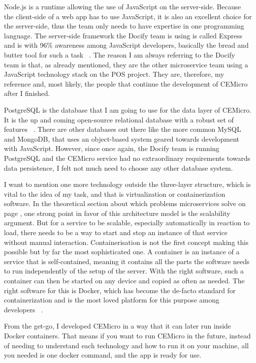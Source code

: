Node.js is a runtime allowing the use of JavaScript on the server-side. Because the client-side of a web app has to use JavaScript, it is also an excellent choice for the server-side, thus the team only needs to have expertise in one programming language. The server-side framework the Docify team is using is called Express and is with 96\% awareness among JavaScript developers, basically the bread and butter tool for such a task ~\cite{stateofjs.2019}. The reason I am always referring to the Docify team is that, as already mentioned, they are the other microservice team using a JavaScript technology stack on the POS project. They are, therefore, my reference and, most likely, the people that continue the development of CEMicro after I finished.

PostgreSQL is the database that I am going to use for the data layer of CEMicro. It is the up and coming open-source relational database with a robust set of features ~\cite{stackoverflow.2019}. There are other databases out there like the more common MySQL and MongoDB, that uses an object-based system geared towards development with JavaScript. However, since once again, the Docify team is running PostgreSQL and the CEMicro service had no extraordinary requirements towards data persistence, I felt not much need to choose any other database system.

I want to mention one more technology outside the three-layer structure, which is vital to the idea of my task, and that is virtualization or containerization software. In the theoretical section about which problems microservices solve on page \pageref{sec:theory:what-problem}, one strong point in favor of this architecture model is the scalability argument. But for a service to be scalable, especially automatically in reaction to load, there needs to be a way to start and stop an instance of that service without manual interaction. Containerisation is not the first concept making this possible but by far the most sophisticated one. A container is an instance of a service that is self-contained, meaning it contains all the parts the software needs to run independently of the setup of the server. With the right software, such a container can then be started on any device and copied as often as needed. The right software for this is Docker, which has become the de-facto standard for containerization and is the most loved platform for this purpose among developers ~\cite{stackoverflow.2019}.

From the get-go, I developed CEMicro in a way that it can later run inside Docker containers. That means if you want to run CEMicro in the future, instead of needing to understand each technology and how to run it on your machine, all you needed is one docker command, and the app is ready for use.



